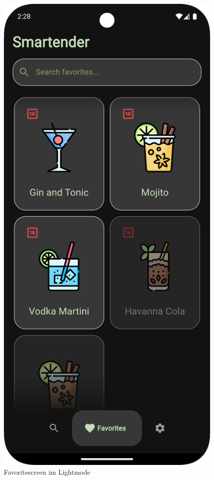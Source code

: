 \begin{figure}[h!]
\begin{minipage}{0.27\textwidth}
        \caption{Favoritescreen im Lightmode}
        \label{fig:favorites_light}
    \end{minipage}
    \hfill
    \begin{minipage}{0.27\textwidth}
        \centering
        \includegraphics[width=\textwidth]{graphics/images/favorites_dark.png}

\end{minipage}
\end{figure}
